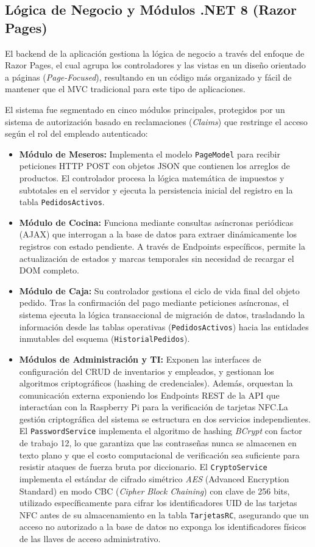 \subsection{Lógica de Negocio y Módulos .NET 8 (Razor Pages)}
El backend de la aplicación gestiona la lógica de negocio a través del enfoque de Razor Pages, el cual agrupa los controladores y las vistas en un diseño orientado a páginas (\textit{Page-Focused}), resultando en un código más organizado y fácil de mantener que el MVC tradicional para este tipo de aplicaciones. 

El sistema fue segmentado en cinco módulos principales, protegidos por un sistema de autorización basado en reclamaciones (\textit{Claims}) que restringe el acceso según el rol del empleado autenticado:

\begin{itemize}
	\item \textbf{Módulo de Meseros:} Implementa el modelo \texttt{PageModel} para recibir peticiones HTTP POST con objetos JSON que contienen los arreglos de productos. El controlador procesa la lógica matemática de impuestos y subtotales en el servidor y ejecuta la persistencia inicial del registro en la tabla \texttt{PedidosActivos}.
	\item \textbf{Módulo de Cocina:} Funciona mediante consultas asíncronas periódicas (AJAX) que interrogan a la base de datos para extraer dinámicamente los registros con estado pendiente. A través de Endpoints específicos, permite la actualización de estados y marcas temporales sin necesidad de recargar el DOM completo.
	\item \textbf{Módulo de Caja:} Su controlador gestiona el ciclo de vida final del objeto pedido. Tras la confirmación del pago mediante peticiones asíncronas, el sistema ejecuta la lógica transaccional de migración de datos, trasladando la información desde las tablas operativas (\texttt{PedidosActivos}) hacia las entidades inmutables del esquema (\texttt{HistorialPedidos}).
	\item \textbf{Módulos de Administración y TI:} Exponen las interfaces de configuración del CRUD de inventarios y empleados, y gestionan los algoritmos criptográficos (hashing de credenciales). Además, orquestan la comunicación externa exponiendo los Endpoints REST de la API que interactúan con la Raspberry Pi para la verificación de tarjetas NFC.La gestión criptográfica del sistema se estructura en dos servicios independientes. 
	El \texttt{PasswordService} implementa el algoritmo de hashing \textit{BCrypt} con 
	factor de trabajo 12, lo que garantiza que las contraseñas nunca se almacenen en 
	texto plano y que el costo computacional de verificación sea suficiente para resistir 
	ataques de fuerza bruta por diccionario. El \texttt{CryptoService} implementa el 
	estándar de cifrado simétrico \textit{AES} (Advanced Encryption Standard) en modo 
	CBC (\textit{Cipher Block Chaining}) con clave de 256 bits, utilizado específicamente 
	para cifrar los identificadores UID de las tarjetas NFC antes de su almacenamiento 
	en la tabla \texttt{TarjetasRC}, asegurando que un acceso no autorizado a la base de 
	datos no exponga los identificadores físicos de las llaves de acceso administrativo.
\end{itemize}


